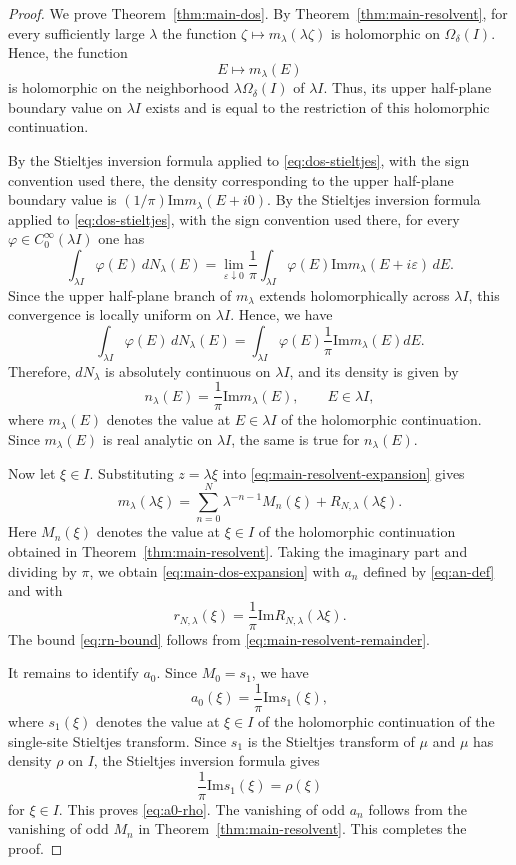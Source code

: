 \documentclass[10pt,a4paper]{amsart}
\newcommand{\Impart}{\mathrm{Im}}
\begin{document}
\begin{proof}
We prove Theorem~\ref{thm:main-dos}.
By Theorem~\ref{thm:main-resolvent}, for every sufficiently large $\lambda$ the function
$\zeta\mapsto m_\lambda(\lambda\zeta)$ is holomorphic on $\Omega_\delta(I)$.
Hence, the function
$$
E\mapsto m_\lambda(E)
$$
is holomorphic on the neighborhood $\lambda\Omega_\delta(I)$ of $\lambda I$.
Thus, its upper half-plane boundary value on $\lambda I$
exists and is equal to the restriction of this holomorphic continuation.

By the Stieltjes inversion formula applied to \eqref{eq:dos-stieltjes}, 
with the sign convention used there, the
density corresponding to the upper half-plane boundary value is
$(1/\pi)\Impart m_\lambda(E+i0)$. 
By the Stieltjes inversion formula applied to
\eqref{eq:dos-stieltjes}, with the sign convention used there, for every
$\varphi\in C_0^\infty(\lambda I)$ one has
$$
\int_{\lambda I}\varphi(E)\,dN_\lambda(E)
=
\lim_{\varepsilon\downarrow0}\frac{1}{\pi}\int_{\lambda I}
\varphi(E)\Impart m_\lambda(E+i\varepsilon)\,dE .
$$
Since the upper half-plane branch of $m_\lambda$ extends holomorphically
across $\lambda I$, this convergence is locally uniform on $\lambda I$.
Hence, we have
$$
\int_{\lambda I}\varphi(E)\,dN_\lambda(E)
=
\int_{\lambda I}
\varphi(E)\frac{1}{\pi}\Impart m_\lambda(E)dE.
$$
Therefore, $dN_\lambda$ is absolutely continuous on $\lambda I$, 
and its density is given by
\begin{equation}
\label{eq:density-boundary}
n_\lambda(E)=\frac{1}{\pi}\Impart m_\lambda(E),\qquad E\in\lambda I,
\end{equation}
where $m_\lambda(E)$ denotes the value at $E\in\lambda I$ of the holomorphic continuation. 
Since $m_\lambda(E)$ is real analytic on $\lambda I$, the same is true for $n_\lambda(E)$.

Now let $\xi\in I$. Substituting $z=\lambda\xi$ into \eqref{eq:main-resolvent-expansion} gives
\begin{equation}
\label{eq:boundary-at-xi}
m_\lambda(\lambda\xi)=\sum_{n=0}^{N}\lambda^{-n-1}M_n(\xi)
+R_{N,\lambda}(\lambda\xi).
\end{equation}
Here $M_n(\xi)$ denotes the value at $\xi\in I$ of the holomorphic
continuation obtained in Theorem~\ref{thm:main-resolvent}. 
Taking the imaginary part and dividing by $\pi$, we obtain
\eqref{eq:main-dos-expansion} with $a_n$ defined by \eqref{eq:an-def} and with
$$
r_{N,\lambda}(\xi)=\frac{1}{\pi}\Impart R_{N,\lambda}(\lambda\xi).
$$
The bound \eqref{eq:rn-bound} follows from \eqref{eq:main-resolvent-remainder}.

It remains to identify $a_0$. 
Since $M_0=s_1$, we have
$$
a_0(\xi)=\frac{1}{\pi}\Impart s_1(\xi),
$$
where $s_1(\xi)$ denotes the value at $\xi\in I$ of the holomorphic
continuation of the single-site Stieltjes transform. 
Since $s_1$ is the Stieltjes transform of $\mu$ and $\mu$ has density $\rho$ on $I$, 
the Stieltjes inversion formula gives
$$
\frac{1}{\pi}\Impart s_1(\xi)=\rho(\xi)
$$
for $\xi\in I$. 
This proves \eqref{eq:a0-rho}. 
The vanishing of odd $a_n$ follows from the vanishing of odd $M_n$ in Theorem~\ref{thm:main-resolvent}.
This completes the proof.
\end{proof}
\end{document}
